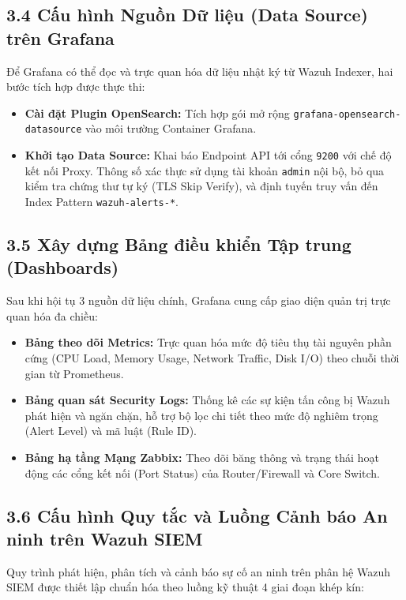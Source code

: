 \documentclass[13pt,a4paper]{extarticle}
\begin{document}
\subsection{3.4 Cấu hình Nguồn Dữ liệu (Data Source) trên Grafana}
Để Grafana có thể đọc và trực quan hóa dữ liệu nhật ký từ Wazuh Indexer, hai bước tích hợp được thực thi:
\begin{itemize}
    \item \textbf{Cài đặt Plugin OpenSearch:} Tích hợp gói mở rộng \texttt{grafana-opensearch-datasource} vào môi trường Container Grafana.
    \item \textbf{Khởi tạo Data Source:} Khai báo Endpoint API tới cổng \texttt{9200} với chế độ kết nối Proxy. Thông số xác thực sử dụng tài khoản \texttt{admin} nội bộ, bỏ qua kiểm tra chứng thư tự ký (TLS Skip Verify), và định tuyến truy vấn đến Index Pattern \texttt{wazuh-alerts-*}.
\end{itemize}

\subsection{3.5 Xây dựng Bảng điều khiển Tập trung (Dashboards)}
Sau khi hội tụ 3 nguồn dữ liệu chính, Grafana cung cấp giao diện quản trị trực quan hóa đa chiều:
\begin{itemize}
    \item \textbf{Bảng theo dõi Metrics:} Trực quan hóa mức độ tiêu thụ tài nguyên phần cứng (CPU Load, Memory Usage, Network Traffic, Disk I/O) theo chuỗi thời gian từ Prometheus.
    \item \textbf{Bảng quan sát Security Logs:} Thống kê các sự kiện tấn công bị Wazuh phát hiện và ngăn chặn, hỗ trợ bộ lọc chi tiết theo mức độ nghiêm trọng (Alert Level) và mã luật (Rule ID).
    \item \textbf{Bảng hạ tầng Mạng Zabbix:} Theo dõi băng thông và trạng thái hoạt động các cổng kết nối (Port Status) của Router/Firewall và Core Switch.
\end{itemize}

\subsection{3.6 Cấu hình Quy tắc và Luồng Cảnh báo An ninh trên Wazuh SIEM}
Quy trình phát hiện, phân tích và cảnh báo sự cố an ninh trên phân hệ Wazuh SIEM được thiết lập chuẩn hóa theo luồng kỹ thuật 4 giai đoạn khép kín:
\end{document}

